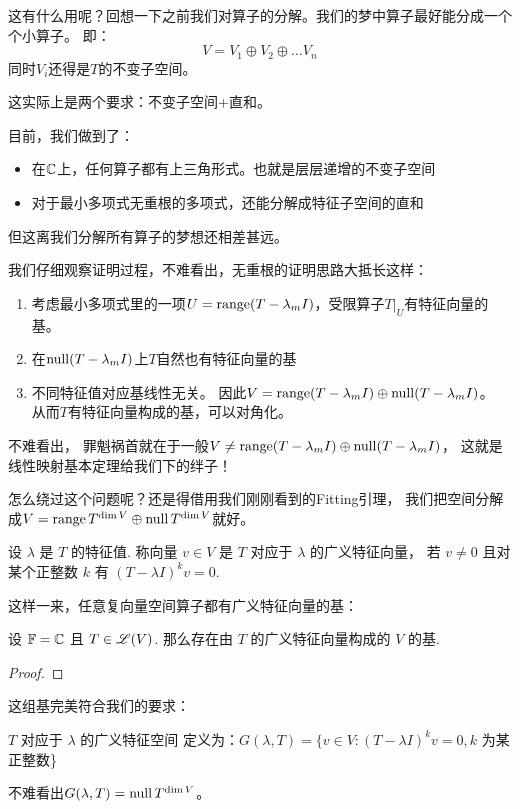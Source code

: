 这有什么用呢？回想一下之前我们对算子的分解。我们的梦中算子最好能分成一个个小算子。
即：\[
    V=V_{1}\oplus V_{2}\oplus \dots V_{n}
\]
同时\(V_{i}\)还得是\(T\)的不变子空间。

这实际上是两个要求：不变子空间+直和。

目前，我们做到了：
\begin{itemize}
    \item 在\(\mathbb{C}\)上，任何算子都有上三角形式。也就是层层递增的不变子空间
    \item 对于最小多项式无重根的多项式，还能分解成特征子空间的直和
\end{itemize}
但这离我们分解所有算子的梦想还相差甚远。

我们仔细观察证明过程，不难看出，无重根的证明思路大抵长这样：
\begin{enumerate}
    \item 考虑最小多项式里的一项\(U=\operatorname{range}(T-\lambda_{m}I)\)，受限算子\(T|_{U}\)有特征向量的基。
    \item 在\(\operatorname{null}(T-\lambda_{m}I)\)上\(T\)自然也有特征向量的基
    \item 不同特征值对应基线性无关。
        因此\(V = \operatorname{range}(T-\lambda_{m}I)\oplus\operatorname{null}(T-\lambda_{m}I) \)。
        从而\(T\)有特征向量构成的基，可以对角化。
\end{enumerate}

不难看出，
罪魁祸首就在于一般\(V \neq  \operatorname{range}(T-\lambda_{m}I)\oplus\operatorname{null}(T-\lambda_{m}I)\)，
这就是线性映射基本定理给我们下的绊子！

怎么绕过这个问题呢？还是得借用我们刚刚看到的Fitting引理，
我们把空间分解成\(V=\operatorname{range} T^{\dim V}\oplus \operatorname{null} T^{\dim V}\)就好。

\begin{definition}
    设 \(\lambda\) 是 \(T\) 的特征值. 称向量 \(v \in V\) 是 \(T\) 对应于 \(\lambda\) 的广义特征向量，
    若 \(v \neq 0\) 且对某个正整数 \(k\) 有 \((T - \lambda I)^k v = 0\).
\end{definition}

这样一来，任意复向量空间算子都有广义特征向量的基：
\begin{theorem}
    设 \(\mathbb{F} = \mathbb{C}\) 且 \(T \in \mathscr{L}(V)\). 那么存在由 \(T\) 的广义特征向量构成的 \(V\) 的基.
\end{theorem}

\begin{proof}

\end{proof}

这组基完美符合我们的要求：
\begin{definition}
    \(T\) 对应于 \(\lambda\) 的广义特征空间
    定义为：\(G(\lambda ,T) = \{v\in V:(T - \lambda I)^k v = 0,k\) 为某正整数\}
\end{definition}
不难看出\(G(\lambda,T) = \operatorname{null} T^{\dim V} \)。


